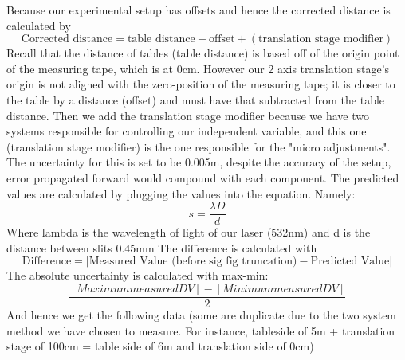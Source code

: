\documentclass[12pt]{article}
\begin{document}
Because our experimental setup has offsets and hence the corrected distance is calculated by
\begin{equation}
    \text{Corrected distance} = \text{table distance} - \text{offset} + (\text{translation stage modifier})
\end{equation}
Recall that the distance of tables (table distance) is based off of the origin point of the measuring tape, which is at 0cm. However our 2 axis translation stage's origin is not aligned with the zero-position of the measuring tape; it is closer to the table by a distance (offset) and must have that subtracted from the table distance. Then we add the translation stage modifier because we have two systems responsible for controlling our independent variable, and this one (translation stage modifier) is the one responsible for the "micro adjustments". The uncertainty for this is set to be 0.005m, despite the accuracy of the setup, error propagated forward would compound with each component.
The predicted values are calculated by plugging the values into the equation. Namely:
\begin{equation}
    s = \frac{\lambda D}{d}
\end{equation}
Where lambda is the wavelength of light of our laser (532nm) and d is the distance between slits 0.45mm
The difference is calculated with
\begin{equation}
    \text{Difference} = \left|\text{Measured Value (before sig fig truncation)} - \text{Predicted Value}\right|
\end{equation}
The absolute uncertainty is calculated with max-min:
\begin{equation}
    \frac{[Maximum measured DV]-[Minimum measured DV]}{2}
\end{equation}
And hence we get the following data (some are duplicate due to the two system method we have chosen to measure. For instance, tableside of 5m + translation stage of 100cm = table side of 6m and translation side of 0cm)
\end{document}
